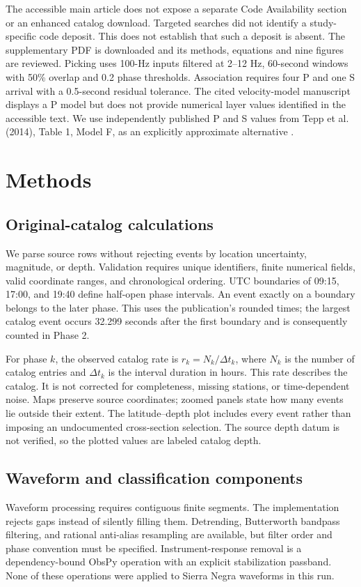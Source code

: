 \documentclass[11pt]{article}
\begin{document}
The accessible main article does not expose a separate Code Availability section or an enhanced catalog download. Targeted searches did not identify a study-specific code deposit. This does not establish that such a deposit is absent. The supplementary PDF is downloaded and its methods, equations and nine figures are reviewed. Picking uses 100-Hz inputs filtered at 2--12 Hz, 60-second windows with 50\% overlap and 0.2 phase thresholds. Association requires four P and one S arrival with a 0.5-second residual tolerance. The cited velocity-model manuscript \citep{rezaeifar2024} displays a P model but does not provide numerical layer values identified in the accessible text. We use independently published P and S values from Tepp et al. (2014), Table 1, Model F, as an explicitly approximate alternative \citep{tepp2014}.

\section{Methods}
\subsection{Original-catalog calculations}
We parse source rows without rejecting events by location uncertainty, magnitude, or depth. Validation requires unique identifiers, finite numerical fields, valid coordinate ranges, and chronological ordering. UTC boundaries of 09:15, 17:00, and 19:40 define half-open phase intervals. An event exactly on a boundary belongs to the later phase. This uses the publication's rounded times; the largest catalog event occurs 32.299 seconds after the first boundary and is consequently counted in Phase 2.

For phase $k$, the observed catalog rate is $r_k=N_k/\Delta t_k$, where $N_k$ is the number of catalog entries and $\Delta t_k$ is the interval duration in hours. This rate describes the catalog. It is not corrected for completeness, missing stations, or time-dependent noise. Maps preserve source coordinates; zoomed panels state how many events lie outside their extent. The latitude--depth plot includes every event rather than imposing an undocumented cross-section selection. The source depth datum is not verified, so the plotted values are labeled catalog depth.

\subsection{Waveform and classification components}
Waveform processing requires contiguous finite segments. The implementation rejects gaps instead of silently filling them. Detrending, Butterworth bandpass filtering, and rational anti-alias resampling are available, but filter order and phase convention must be specified. Instrument-response removal is a dependency-bound ObsPy operation with an explicit stabilization passband. None of these operations were applied to Sierra Negra waveforms in this run.
\end{document}
